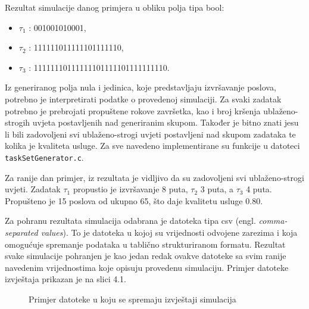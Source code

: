 \documentclass[../zavrsni.tex]{subfiles}
\begin{document}
Rezultat simulacije danog primjera u obliku polja tipa bool:

\begin{itemize}
        \item[] $\tau_1$ : 001001010001,
        \item[] $\tau_2$ : 111111011111101111110,
        \item[] $\tau_3$ : 11111110111111101111101111111110.
\end{itemize}

Iz generiranog polja nula i jedinica, koje predstavljaju izvršavanje poslova, potrebno je interpretirati podatke o provedenoj simulaciji.
Za svaki zadatak potrebno je prebrojati propuštene rokove završetka, kao i broj kršenja ublaženo-strogih uvjeta postavljenih nad generiranim skupom.
Također je bitno znati jesu li bili zadovoljeni svi ublaženo-strogi uvjeti 
postavljeni nad skupom zadataka te kolika je kvaliteta usluge. Za sve navedeno implementirane su funkcije u datoteci \texttt{taskSetGenerator.c}.

Za ranije dan primjer, iz rezultata je vidljivo da su zadovoljeni svi ublaženo-strogi uvjeti. Zadatak $\tau_1$ 
propustio je izvršavanje 8 puta, $\tau_2$ 3 puta, a $\tau_3$ 4 puta. Propušteno je 15 poslova od ukupno 65, što
daje kvalitetu usluge 0.80. 

Za pohranu rezultata simulacija odabrana je datoteka tipa csv (engl. \textit{comma-separated values}). To je datoteka u kojoj su vrijednosti odvojene zarezima 
i koja omogućuje spremanje podataka u tablično strukturiranom formatu. Rezultat svake simulacije pohranjen je kao jedan redak ovakve datoteke sa svim ranije 
navedenim vrijednostima koje opisuju provedenu simulaciju. Primjer datoteke izvještaja prikazan je na slici 4.1.

\begin{figure}[!htb]
    \caption{\label{fig:my-label} Primjer datoteke u koju se spremaju izvještaji simulacija}
  \end{figure}
\end{document}
